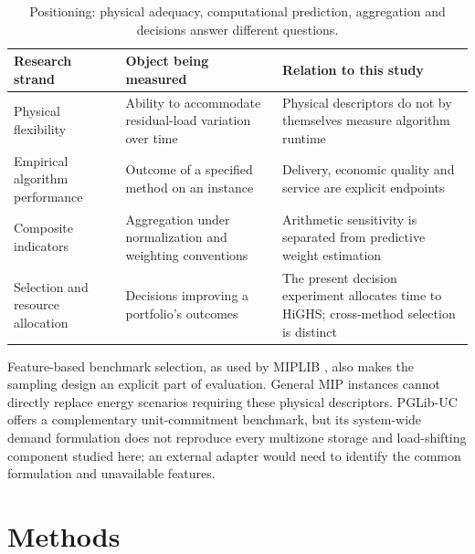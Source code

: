 \begin{table}[htbp]\centering\small
\begin{tabular}{>{\raggedright\arraybackslash}p{.23\linewidth}>{\raggedright\arraybackslash}p{.31\linewidth}>{\raggedright\arraybackslash}p{.35\linewidth}}\toprule
Research strand & Object being measured & Relation to this study\\\midrule
Physical flexibility \citep{lannoye2012,ulbig2015,terca2026flexibility} & Ability to accommodate residual-load variation over time & Physical descriptors do not by themselves measure algorithm runtime\\
Empirical algorithm performance \citep{hutter2013} & Outcome of a specified method on an instance & Delivery, economic quality and service are explicit endpoints\\
Composite indicators \citep{oecd2008} & Aggregation under normalization and weighting conventions & Arithmetic sensitivity is separated from predictive weight estimation\\
Selection and resource allocation \citep{rice1976,bischl2016} & Decisions improving a portfolio's outcomes & The present decision experiment allocates time to HiGHS; cross-method selection is distinct\\\bottomrule
\end{tabular}
\caption{Positioning: physical adequacy, computational prediction, aggregation and decisions answer different questions.}
\end{table}
Feature-based benchmark selection, as used by MIPLIB \citep{miplibselection},
also makes the sampling design an explicit part of evaluation. General MIP
instances cannot directly replace energy scenarios requiring these physical
descriptors. PGLib-UC \citep{pglibuc} offers a complementary unit-commitment
benchmark, but its system-wide demand formulation does not reproduce every
multizone storage and load-shifting component studied here; an external
adapter would need to identify the common formulation and unavailable features.

\section{Methods}
\label{sec:methods}
